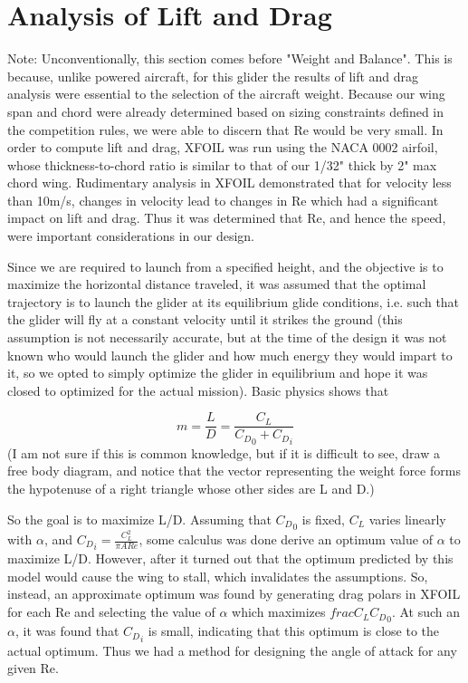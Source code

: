 \documentclass{article}
\begin{document}
\section{Analysis of Lift and Drag}

Note: Unconventionally, this section comes before "Weight and Balance". This is because, unlike powered aircraft, for this glider the results
of lift and drag analysis were essential to the
selection of the aircraft weight. Because our wing span and chord were already determined based on sizing constraints defined in the competition
rules, we were able to discern that Re would be very small. In order to compute lift and drag, XFOIL was run using the NACA 0002 airfoil, whose
thickness-to-chord ratio is similar to that of our 1/32" thick by 2" max chord wing. Rudimentary analysis in XFOIL demonstrated that for
velocity less than 10m/s, changes in velocity lead to changes in Re which had a significant impact on lift and drag. Thus it was determined
that Re, and hence the speed, were important considerations in our design.

Since we are required to launch from a specified height, and the
objective is to maximize the horizontal distance traveled, it was assumed that the optimal trajectory is to launch the glider at its equilibrium
glide conditions, i.e. such that the glider will fly at a constant velocity until it strikes the ground (this assumption is not necessarily
accurate, but at the time of the design it was not known who would launch the glider and how much energy they would impart to it, so we opted
to simply optimize the glider in equilibrium and hope it was closed to optimized for the actual mission). Basic physics shows that

\[m = \frac{L}{D} = \frac{C_L}{{C_D}_0 + {C_D}_i}\]
(I am not sure if this is common knowledge, but if it is difficult to see, draw a free body diagram, and notice that the vector representing
the weight force forms the hypotenuse of a right triangle whose other sides are L and D.)

So the goal is to maximize L/D. Assuming that ${C_D}_0$ is fixed, $C_L$ varies linearly with $\alpha$, and ${C_D}_i = \frac{C_L^2}{\pi AR e}$,
some calculus was done derive an optimum value of $\alpha$ to maximize L/D. However, after it turned out that the optimum predicted by this model
would cause the wing to stall, which invalidates the assumptions. So, instead, an approximate optimum was found by generating drag polars in XFOIL
for each Re and selecting the value of $\alpha$ which maximizes $frac{C_L}{{C_D}_0}$. At such an $\alpha$, it was found that ${C_D}_i$ is small,
indicating that this optimum is close to the actual optimum. Thus we had a method for designing the angle of attack for any given Re.
\end{document}
